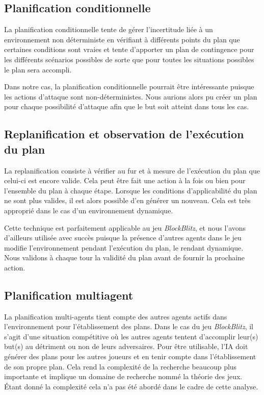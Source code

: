 \documentclass[12pt,english,frenchb,letterpaper]{article}
\begin{document}
\subsection{Planification conditionnelle}
La planification conditionnelle tente de gérer l'incertitude liée à un environnement non déterministe en vérifiant à différents points du plan que certaines conditions sont vraies et tente d'apporter un plan de contingence pour les différents scénarios possibles de sorte que pour toutes les situations possibles le plan sera accompli.

Dans notre cas, la planification conditionnelle pourrait être intéressante puisque les actions d'attaque sont non-déterministes. Nous aurions alors pu créer un plan pour chaque possibilité d'attaque afin que le but soit atteint dans tous les cas.

\subsection{Replanification et observation de l'exécution du plan}
La replanification consiste à vérifier au fur et à mesure de l'exécution du plan que celui-ci est encore valide.  Cela peut être fait une action à la fois ou bien pour l'ensemble du plan à chaque étape.  Lorsque les conditions d'applicabilité du plan ne sont plus valides, il est alors possible d'en générer un nouveau. Cela est très approprié dans le cas d'un environnement dynamique.

Cette technique est parfaitement applicable au jeu \textit{BlockBlitz}, et nous l'avons d'ailleurs utilisée avec succès puisque la présence d'autres agents dans le jeu modifie l'environnement pendant l'exécution du plan, le rendant dynamique.  Nous validons à chaque tour la validité du plan avant de fournir la prochaine action.

\subsection{Planification multiagent}

La planification multi-agents tient compte des autres agents actifs dans l'environnement pour l'établissement des plans.  Dans le cas du jeu \textit{BlockBlitz}, il s'agit d'une situation compétitive où les autres agents tentent d'accomplir leur(s) but(s) au détriment ou non de leurs adversaires.  Pour être utilisable, l'IA doit générer des plans pour les autres joueurs et en tenir compte dans l'établissement de son propre plan.  Cela rend la complexité de la recherche beaucoup plus importante et implique un domaine de recherche nommé la théorie des jeux.  Étant donné la complexité cela n'a pas été abordé dans le cadre de cette analyse.  
\end{document}
